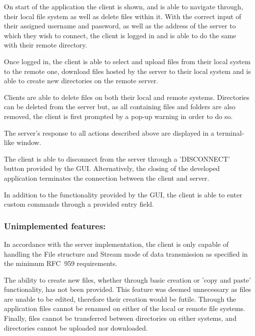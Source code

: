 \documentclass[10pt,twocolumn]{witseiepaper}
\begin{document}
On start of the application the client is shown, and is able to navigate through, their local file system as well as delete files within it.
With the correct input of their assigned username and password, as well as the address of the server to which they wish to connect, the client is logged in and is able to do the same with their remote directory. 

Once logged in, the client is able to select and upload files from their local system to the remote one, download files hosted by the server to their local system and is able to create new directories on the remote server.

Clients are able to delete files on both their local and remote systems. Directories can be deleted from the server but, as all containing files and folders are also removed, the client is first prompted by a pop-up warning in order to do so.

The server's response to all actions described above are displayed in a terminal-like window. 

The client is able to disconnect from the server through a 'DISCONNECT' button provided by the GUI. Alternatively, the closing of the developed application terminates the connection between the client and server.

In addition to the functionality provided by the GUI, the client is able to enter custom commands through a provided entry field. 


\vspace*{-\baselineskip}
\subsubsection*{Unimplemented features: } 
In accordance with the server implementation, the client is only capable of handling the File structure and Stream mode of data transmission as specified in the minimum RFC~959 requirements.

The ability to create new files, whether through basic creation or 'copy and paste' functionality, has not been provided. This feature was deemed unnecessary as files are unable to be edited, therefore their creation would be futile. Through the application files cannot be renamed on either of the local or remote file systems. Finally, files cannot be transferred between directories on either systems, and directories cannot be uploaded nor downloaded.


\end{document}
